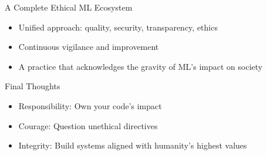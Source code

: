 \documentclass[aspectratio=169]{beamer}
\begin{document}

\begin{frame}{A Complete Ethical ML Ecosystem}
\begin{itemize}
\item Unified approach: quality, security, transparency, ethics
\item Continuous vigilance and improvement
\item A practice that acknowledges the gravity of ML’s impact on society
\end{itemize}
\end{frame}


\begin{frame}{Final Thoughts}

\begin{itemize}
\item Responsibility: Own your code’s impact
\item Courage: Question unethical directives
\item Integrity: Build systems aligned with humanity’s highest values
\end{itemize}
\end{frame}
\end{document}

